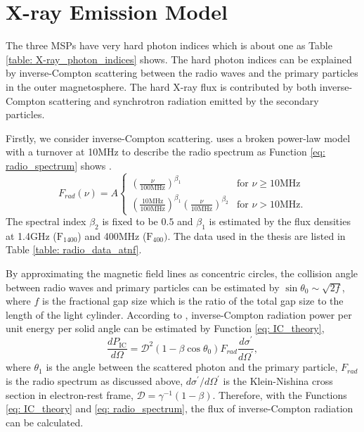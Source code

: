 \documentclass[a4paper, 12pt]{report}
\begin{document}
  \section{X-ray Emission Model}
    The three MSPs have very hard photon indices which is about one as Table 
    \ref{table: X-ray_photon_indices} shows. The hard photon indices can be explained by 
    inverse-Compton scattering between the radio waves and the primary particles in the 
    outer magnetosphere. The hard X-ray flux is contributed by both inverse-Compton 
    scattering and synchrotron radiation emitted by the secondary particles. 
    
    Firstly, we consider inverse-Compton scattering. \citet{0004-637X-787-2-167} uses a 
    broken power-law model with a turnover at 10MHz to describe the radio spectrum as 
    Function \ref{eq: radio_spectrum} shows \citep{0004-637X-787-2-167}.
    \begin{equation}
      \label{eq: radio_spectrum}
        F_{rad}\left(\nu\right) = A \left.
        \begin{cases}
          \left(\frac{\nu}{100\text{MHz}}\right)^{\beta_1} & \text{for } \nu \geq 10\text{MHz} \\
          \left(\frac{10\text{MHz}}{100\text{MHz}}\right)^{\beta_1} \left(\frac{\nu}{10\text{MHz}}\right)^{\beta_2}& \text{for } \nu > 10\text{MHz} .
        \end{cases}     
        \right.  
    \end{equation} 
    The spectral index $\beta_2$ is fixed to be $0.5$ and $\beta_1$ is estimated by the 
    flux densities at 1.4GHz ($\mbox{F}_{1400}$) and 400MHz ($\mbox{F}_{400})$. The data 
    used in the thesis are listed in Table \ref{table: radio_data_atnf}. 

    By approximating the magnetic field lines as concentric circles, the collision angle 
    between radio waves and primary particles can be estimated by 
    $\sin{\theta_0}\sim \sqrt{2f}$, where $f$ is the fractional gap size which is the 
    ratio of the total gap size to the length of the light cylinder. According to 
    \citet{0004-637X-787-2-167}, inverse-Compton radiation power per unit energy per solid 
    angle can be estimated by Function \ref{eq: IC_theory},
    \begin{equation}
      \label{eq: IC_theory}
      \frac{dP_\text{IC}}{d\Omega} = \mathcal{D}^{2}\left(1-\beta \cos{\theta_{0}}\right) F_{rad} \frac{d\sigma^{\prime}}{d\Omega^{\prime}} ,
    \end{equation}
    where $\theta_1$ is the angle between the scattered photon and the primary particle, 
    $F_{rad}$ is the radio spectrum 
    as discussed above, $d\sigma^{\prime}/d\Omega^{\prime}$ is the Klein-Nishina cross 
    section in electron-rest frame, $\mathcal{D} = \gamma^{-1}\left(1-\beta\right)$.
    Therefore, with the Functions \ref{eq: IC_theory} and \ref{eq: radio_spectrum}, the 
    flux of inverse-Compton radiation can be calculated. 
\end{document}
